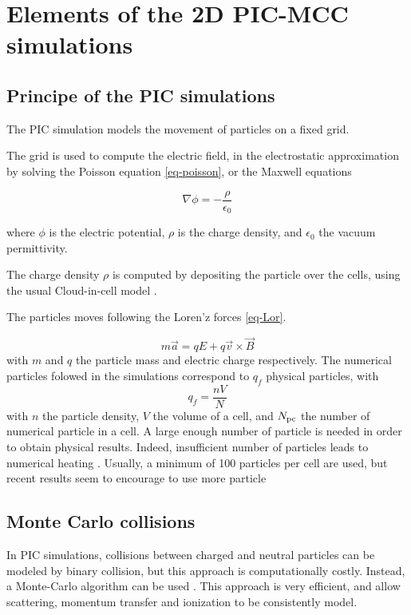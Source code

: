 

\section{Elements of the 2D PIC-MCC simulations}

\subsection{Principe of the PIC simulations}

The \ac{PIC} simulation models the movement of particles on a fixed grid.

The grid is used to compute the electric field, in the electrostatic approximation by solving the Poisson equation \vref{eq-poisson}, or the Maxwell equations

\begin{equation}
  \label{eq-poisson}
  \nabla \phi = - \frac{\rho}{\epsilon_0}
\end{equation}

where $\phi$ is the electric potential, $\rho$ is the charge density, and $\epsilon_0$ the vacuum permittivity.

The charge density $\rho$ is computed by depositing the particle over the cells, using the usual Cloud-in-cell model \cite{birdsall1991}.

The particles moves following the Loren'z forces \cref{eq-Lor}.

\begin{equation}
  \label{eq-Lor}
  m \vec{a} = q E + q \vec{v} \times \vec{B}
\end{equation}
with $m$ and $q$ the particle mass and electric charge respectively.
The numerical particles folowed in the simulations correspond to $q_f$ physical particles, with
\begin{equation}
  q_f = \frac{n V}{N}
\end{equation}
with $n$ the particle density, $V$ the volume of a cell, and $N_{\rm pc}$ the number of numerical particle in a cell.
A large enough number of particle is needed in order to obtain physical results.
Indeed, insufficient number of particles leads to numerical heating \cite{ueda1994}.
Usually, a minimum of 100 particles per cell are used, but recent results seem to encourage to use more particle \cite{janhunen2018}

\subsection{Monte Carlo collisions}

In \ac{PIC} simulations, collisions between charged and neutral particles can be modeled by binary collision, but this approach is computationally costly.
Instead, a Monte-Carlo algorithm can be used \cite{vahedi1995}.
This approach is very efficient, and allow scattering, momentum transfer and ionization to be consistently model.
